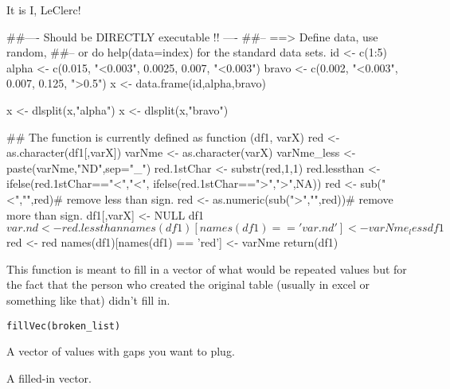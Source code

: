 \documentclass[letterpaper]{book}
\begin{document}
%
\begin{Author}\relax
It is I, LeClerc!
\end{Author}
%
\begin{Examples}
\begin{ExampleCode}
##---- Should be DIRECTLY executable !! ----
##-- ==>  Define data, use random,
##--	or do  help(data=index)  for the standard data sets.
id <- c(1:5)
alpha <- c(0.015, "<0.003", 0.0025, 0.007, "<0.003")
bravo <- c(0.002, "<0.003", 0.007, 0.125, ">0.5")
x <- data.frame(id,alpha,bravo)

x <- dlsplit(x,"alpha")
x <- dlsplit(x,"bravo")

## The function is currently defined as
function (df1, varX) 
{
		red <- as.character(df1[,varX])
		varNme <- as.character(varX)
		varNme_less <- paste(varNme,"ND",sep="_")
		red.1stChar <- substr(red,1,1)
		red.lessthan <- ifelse(red.1stChar=="<","<",
										ifelse(red.1stChar==">",">",NA))
		red <- sub("<","",red)# remove less than sign.
		red <- as.numeric(sub(">","",red))# remove more than sign. 
		df1[,varX] <- NULL
		df1$var.nd <- red.lessthan
		names(df1)[names(df1) == 'var.nd'] <- varNme_less
		df1$red <- red
		names(df1)[names(df1) == 'red'] <- varNme
		return(df1)
		}
\end{ExampleCode}
\end{Examples}
%
\begin{Description}\relax
This function is meant to fill in a vector of what would be repeated values but for the fact that the person who created the original table (usually in excel or something like that) didn't fill in. 
\end{Description}
%
\begin{Usage}
\begin{verbatim}
fillVec(broken_list)
\end{verbatim}
\end{Usage}
%
\begin{Arguments}
\begin{ldescription}
\item[\code{broken\_list}] 
A vector of values with gaps you want to plug. 

\end{ldescription}
\end{Arguments}
%
\begin{Value}
A filled-in vector. 
\end{Value}
\end{document}
